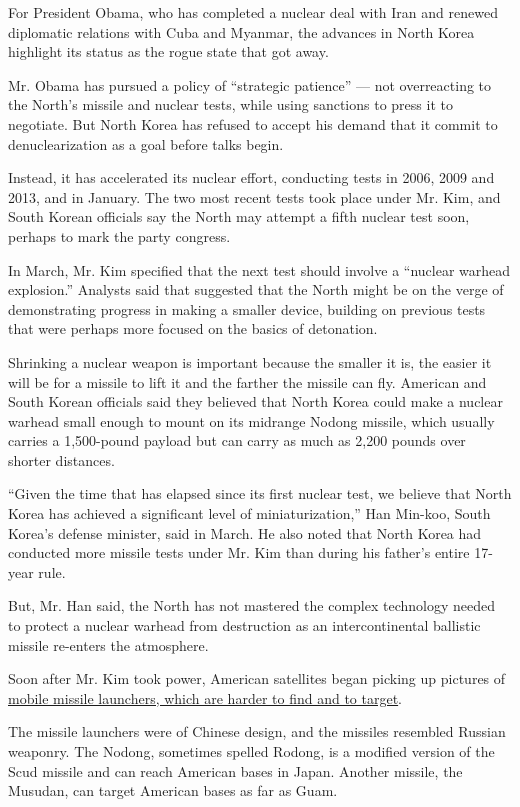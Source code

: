 For President Obama, who has completed a nuclear deal with Iran and
renewed diplomatic relations with Cuba and Myanmar, the advances in
North Korea highlight its status as the rogue state that got away.

Mr. Obama has pursued a policy of ``strategic patience'' --- not
overreacting to the North's missile and nuclear tests, while using
sanctions to press it to negotiate. But North Korea has refused to
accept his demand that it commit to denuclearization as a goal before
talks begin.

Instead, it has accelerated its nuclear effort, conducting tests in
2006, 2009 and 2013, and in January. The two most recent tests took
place under Mr. Kim, and South Korean officials say the North may
attempt a fifth nuclear test soon, perhaps to mark the party congress.

In March, Mr. Kim specified that the next test should involve a
``nuclear warhead explosion.'' Analysts said that suggested that the
North might be on the verge of demonstrating progress in making a
smaller device, building on previous tests that were perhaps more
focused on the basics of detonation.

Shrinking a nuclear weapon is important because the smaller it is, the
easier it will be for a missile to lift it and the farther the missile
can fly. American and South Korean officials said they believed that
North Korea could make a nuclear warhead small enough to mount on its
midrange Nodong missile, which usually carries a 1,500-pound payload but
can carry as much as 2,200 pounds over shorter distances.

``Given the time that has elapsed since its first nuclear test, we
believe that North Korea has achieved a significant level of
miniaturization,'' Han Min-koo, South Korea's defense minister, said in
March. He also noted that North Korea had conducted more missile tests
under Mr. Kim than during his father's entire 17-year rule.

But, Mr. Han said, the North has not mastered the complex technology
needed to protect a nuclear warhead from destruction as an
intercontinental ballistic missile re-enters the atmosphere.

Soon after Mr. Kim took power, American satellites began picking up
pictures of
\href{http://www.nytimes.com/2013/01/18/world/asia/north-koreas-missile-movements-worry-us.html}{mobile
missile launchers, which are harder to find and to target}.

The missile launchers were of Chinese design, and the missiles resembled
Russian weaponry. The Nodong, sometimes spelled Rodong, is a modified
version of the Scud missile and can reach American bases in Japan.
Another missile, the Musudan, can target American bases as far as Guam.

